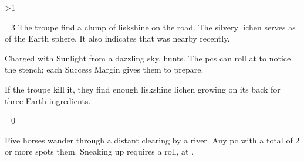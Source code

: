 \ifnum\value{temperature}>1

\ifnum\value{temperature}=3
  The troupe find a clump of liskshine on the road.
  The silvery lichen serves as  of the Earth \gls{sphere}.
  It also indicates that  was nearby recently.
\fi

\basilisk

Charged with Sunlight from a dazzling sky,  hunts.
The \glspl{pc} can roll  at \tn[5] to notice the stench; each Success Margin gives them  to prepare.

If the troupe kill it, they find enough liskshine lichen growing on its back for three Earth \glspl{ingredient}.%

\else

\ifnum\value{temperature}=0
\fi


Five horses wander through a distant clearing by a river.
Any \gls{pc} with a  total of 2 or more spots them.
Sneaking up requires a  roll, at
\tn.

\fi
